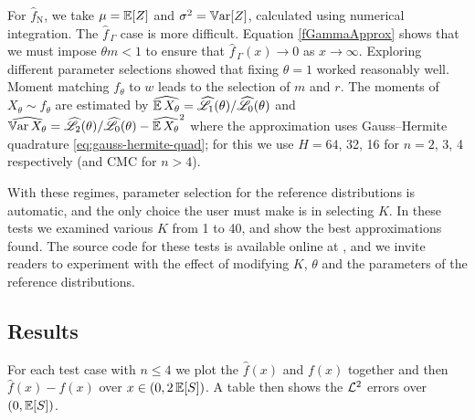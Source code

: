 

For $\widehat{f}_{\mathrm{N}}$, we take $\mu = \operatorname{{\mathbb E}}[Z]$ and $\sigma^2 = \operatorname{\mathbb{V}\mathrm{ar}}[Z]$, calculated using numerical integration.
The $\widehat{f}_{\,\Gamma}$ case is more difficult. Equation \eqref{fGammaApprox} shows that we must impose $\theta m < 1$ to ensure that $\widehat{f}_{\,\Gamma}(x)\to 0$ as $x\to \infty$.
Exploring different parameter selections showed that fixing $\theta = 1$ worked reasonably well. Moment matching $f_\theta$ to $w$ leads to the selection of $m$ and $r$. The moments of $X_\theta \sim f_\theta$ are estimated by
$ \widehat{\operatorname{{\mathbb E}} X_\theta} = \widehat{\mathscr{L}}_1(\theta) / \widehat{\mathscr{L}}_0(\theta)$  and
 $\widehat{\operatorname{\mathbb{V}\mathrm{ar}} X_\theta} = \widehat{\mathscr{L}}_2(\theta) / \widehat{\mathscr{L}}_0(\theta) - \widehat{\operatorname{{\mathbb E}} X_\theta}^2  $ where the approximation uses Gauss--Hermite quadrature \eqref{eq:gauss-hermite-quad}; for this we use $H = 64$, 32, 16 for $n=2$, 3, 4 respectively (and CMC for $n > 4$).

With these regimes, parameter selection for the reference distributions is automatic, and the only choice the user must make is in selecting $K$. In these tests we examined various $K$ from 1 to 40, and show the best approximations found.
The source code for these tests is available online at \cite{OrthogoCode}, and we invite readers to experiment with the effect of modifying $K$, $\theta$ and the parameters of the reference distributions.



\subsection{Results}

For each test case with $n \le 4$ we plot the $\widehat{f}(x)$ and $f(x)$ together and then $\widehat{f}(x)-f(x)$ over $x \in (0, 2\operatorname{{\mathbb E}}[S])$. A table then shows the $\mathcal{L}^2$ errors over $(0, \operatorname{{\mathbb E}}[S])$. %
\setlength\extrarowheight{3pt}

